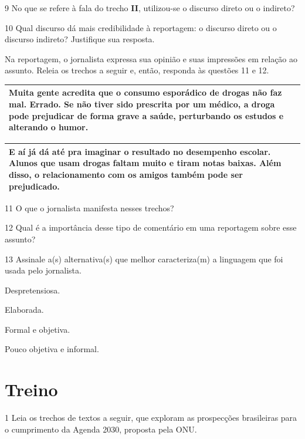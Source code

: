 \begin{itemize}
\begin{itemize}
\num{9} No que se refere à fala do trecho \textbf{II}, utilizou-se o
discurso direto ou o indireto?  

\num{10} Qual discurso dá mais credibilidade à reportagem: o discurso
direto ou o discurso indireto? Justifique sua resposta. 

Na reportagem, o jornalista expressa sua opinião e suas impressões em
relação ao assunto. Releia os trechos a seguir e, então, responda às
questões 11 e 12.

\begin{longtable}[]{@{}l@{}}
\toprule
Muita gente acredita que o consumo esporádico de drogas não faz mal.
Errado. Se não tiver sido prescrita por um médico, a droga pode
prejudicar de forma grave a saúde, perturbando os estudos e alterando o
humor.\tabularnewline
\bottomrule
\end{longtable}

\begin{longtable}[]{@{}l@{}}
\toprule
E aí já dá até pra imaginar o resultado no desempenho escolar. Alunos
que usam drogas faltam muito e tiram notas baixas. Além disso, o
relacionamento com os amigos também pode ser prejudicado.\tabularnewline
\bottomrule
\end{longtable}

\num{11} O que o jornalista manifesta nesses trechos? 

\num{12} Qual é a importância desse tipo de comentário em uma reportagem
sobre esse assunto? 

\num{13} Assinale a(s) alternativa(s) que melhor caracteriza(m) a
linguagem que foi usada pelo jornalista.

 Despretensiosa.

 Elaborada.

 Formal e objetiva.

 Pouco objetiva e informal.

\section{Treino}

\num{1} Leia os trechos de textos a seguir, que exploram as prospecções
brasileiras para o cumprimento da Agenda 2030, proposta pela ONU.


\end{itemize}
\end{itemize}
